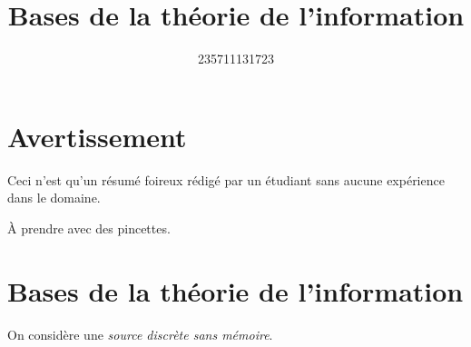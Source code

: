 \documentclass{article}
\title{Bases de la théorie de l'information}
\author{235711131723}
\begin{document}
    \maketitle

    \section{Avertissement}

    Ceci n'est qu'un résumé foireux rédigé par un étudiant sans aucune expérience dans le domaine.

    À prendre avec des pincettes. 

    \section{Bases de la théorie de l'information}

    On considère une \emph{source discrète sans mémoire}.
    
\end{document}
